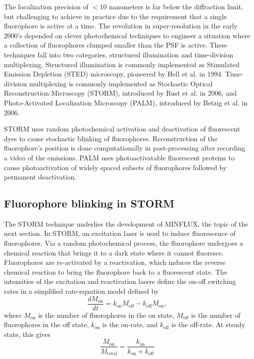 \documentclass[12pt]{article}
\begin{document}
The localization precision of $<10$ nanometers is far below the diffraction limit, but challenging to achieve in practice due to the requirement that a single fluorophore is active at a time. The revolution in super-resolution in the early 2000's depended on clever photochemical techniques to engineer a situation where a collection of fluorophores clumped smaller than the PSF is active. These techniques fall into two categories, structured illumination and time-division multiplexing. Structured illumination is commonly implemented as Stimulated Emission Depletion (STED) microscopy, pioneered by Hell et al. \cite{hellBreakingDiffractionResolution1994} in 1994. Time-division multiplexing is commonly implemented as Stochastic Optical Reconstruction Microscopy (STORM), introduced by Rust et al. \cite{rustSubdiffractionlimitImagingStochastic2006} in 2006, and Photo-Activated Localization Microscopy (PALM), introduced by Betzig et al. \cite{betzigImagingIntracellularFluorescent2006} in 2006.

STORM uses random photochemical activation and deactivation of fluorescent dyes to cause stochastic blinking of fluorophores. Reconstruction of the fluorophore's position is done computationally in post-processing after recording a video of the emissions. PALM uses photoactivatable fluorescent proteins to cause photoactivation of widely spaced subsets of fluorophores followed by permanent deactivation. 

\subsection{Fluorophore blinking in STORM}

The STORM technique underlies the development of MINFLUX, the topic of the next section. In STORM, an excitation laser is used to induce fluorescence of fluorophores. Via a random photochemical process, the fluorophore undergoes a chemical reaction that brings it to a dark state where it cannot fluoresce. Fluorophores are re-activated by a reactivation, which induces the reverse chemical reaction to bring the fluorophore back to a fluorescent state. The intensities of the excitation and reactivation lasers define the on-off switching rates in a simplified rate-equation model \cite{heilemannSubdiffractionResolutionFluorescenceImaging2008} defined by
\[
\frac{dM_{\text{on}}}{dt} = k_{\text{on}} M_{\text{off}} - k_{\text{off}} M_{\text{on}},
\]
where $M_{\text{on}}$ is the number of fluorophores in the on state, $M_{\text{off}}$ is the number of fluorophores in the off state, $k_{\text{on}}$ is the on-rate, and $k_{\text{off}}$ is the off-rate. At steady state, this gives
\[
\frac{M_{\text{on}}}{M_{\text{total}}} = \frac{k_{\text{on}}}{k_{\text{on}} + k_{\text{off}}}
\]
\end{document}
